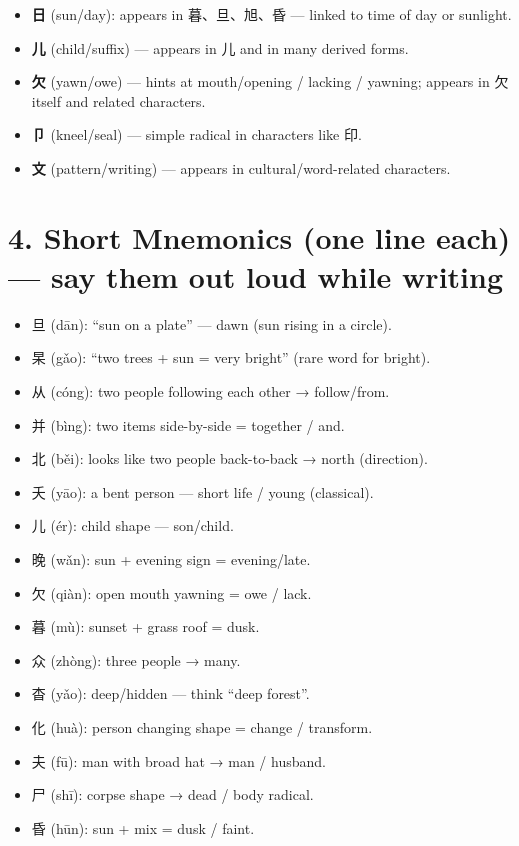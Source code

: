\documentclass[12pt]{article}
\begin{document}
\begin{CJK}{UTF8}{gbsn}
\begin{itemize}
  \item \textbf{日} (sun/day): appears in 暮、旦、旭、昏 — linked to time of day or sunlight.
  \item \textbf{儿} (child/suffix) — appears in 儿 and in many derived forms.
  \item \textbf{欠} (yawn/owe) — hints at mouth/opening / lacking / yawning; appears in 欠 itself and related characters.
  \item \textbf{卩} (kneel/seal) — simple radical in characters like 印.
  \item \textbf{文} (pattern/writing) — appears in cultural/word-related characters.
\end{itemize}

\section*{4. Short Mnemonics (one line each) — say them out loud while writing}
\begin{itemize}[leftmargin=*]
  \item 旦 (dān): ``sun on a plate'' — dawn (sun rising in a circle).  
  \item 杲 (gǎo): ``two trees + sun = very bright'' (rare word for bright).
  \item 从 (cóng): two people following each other → follow/from.
  \item 并 (bìng): two items side-by-side = together / and.
  \item 北 (běi): looks like two people back-to-back → north (direction).
  \item 夭 (yāo): a bent person — short life / young (classical).
  \item 儿 (ér): child shape — son/child.
  \item 晚 (wǎn): sun + evening sign = evening/late.
  \item 欠 (qiàn): open mouth yawning = owe / lack.
  \item 暮 (mù): sunset + grass roof = dusk.
  \item 众 (zhòng): three people → many.
  \item 杳 (yǎo): deep/hidden — think ``deep forest''.
  \item 化 (huà): person changing shape = change / transform.
  \item 夫 (fū): man with broad hat → man / husband.
  \item 尸 (shī): corpse shape → dead / body radical.
  \item 昏 (hūn): sun + mix = dusk / faint.

\end{itemize}
\end{CJK}
\end{document}
